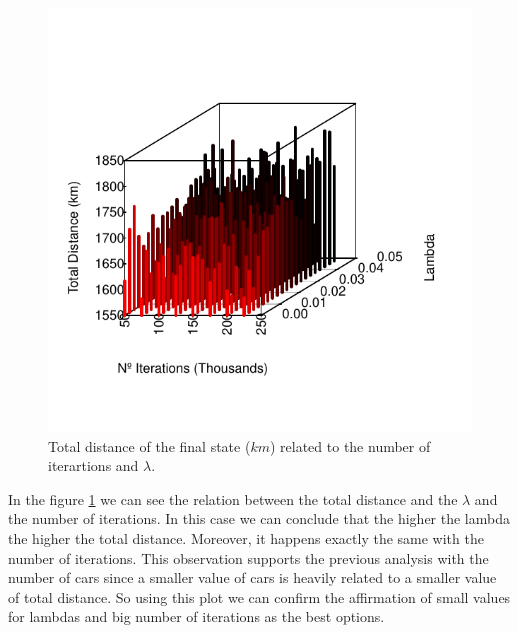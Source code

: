 \documentclass[12]{article}
\begin{document}
       \begin{figure}
       \captionsetup{justification=centering}
       \centering
        \includegraphics[scale=0.9]{Results/data_B_3.pdf}
        \caption{Total distance of the final state ($km$) related to the number of iterartions and $\lambda$.}
        \label{fig:data4}
    \end{figure}
      \vspace{1cm}
In the figure \ref{fig:data4} we can see the relation between the total distance and the $\lambda$ and the number of iterations. In this case we can conclude that the higher the lambda the higher the total distance. Moreover, it happens exactly the same with the number of iterations. This observation supports the previous analysis with the number of cars since a smaller value of cars is heavily related to a smaller value of total distance. So using this plot we can confirm the affirmation of small values for lambdas and big number of iterations as the best options. 
    
\end{document}
